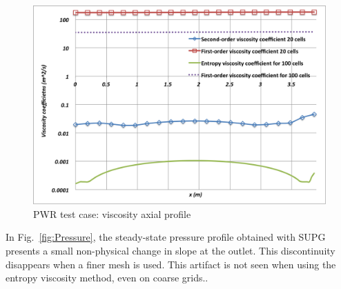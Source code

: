 \documentclass[12pt]{article}
\newcommand{\fig}[1]{Fig.~\ref{#1}} %
\begin{document}
\begin{figure}[h]
\centering
\includegraphics[scale=0.4]{plots/Viscosity.png}
\caption{PWR test case: viscosity axial profile}
\label{fig:Viscosity}
\end{figure}
In \fig{fig:Pressure}, the steady-state pressure profile obtained with SUPG presents a small non-physical change in slope at the outlet. This discontinuity disappears when a finer mesh is used. This artifact is not seen when using the entropy viscosity method, even on coarse grids.. \\
\end{document}
